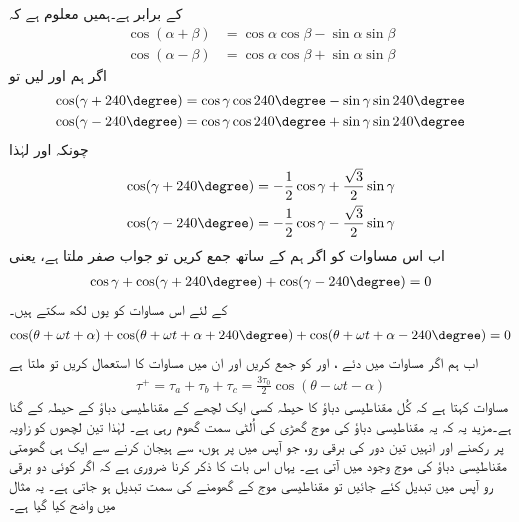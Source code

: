 کے برابر ہے۔ہمیں معلوم ہے کہ 
\begin{align*}
\cos  (\alpha +\beta)&=\cos \alpha \cos \beta-\sin \alpha \sin \beta\\
\cos  (\alpha -\beta)&=\cos \alpha \cos \beta+\sin \alpha \sin \beta
\end{align*}
اگر ہم  اور  لیں تو
\begin{align*}
\cos (\gamma+240\degree)&=\cos \gamma \cos 240\degree-\sin \gamma \sin 240\degree\\
\cos (\gamma-240\degree)&=\cos \gamma \cos 240\degree+\sin \gamma \sin 240\degree
\end{align*}
چونکہ  اور  لہٰذا
\begin{align*}
\cos (\gamma+240\degree)&=-\frac{1}{2}\cos \gamma +\frac{\sqrt{3}}{2}\sin \gamma\\
\cos (\gamma-240\degree)&=-\frac{1}{2}\cos \gamma -\frac{\sqrt{3}}{2}\sin \gamma
\end{align*}
اب اس مساوات کو اگر ہم   کے ساتھ جمع کریں تو جواب صفر ملتا ہے، یعنی
\begin{align*}
\cos \gamma +\cos (\gamma+240\degree)+\cos (\gamma-240\degree)=0
\end{align*}
 کے لئے اس مساوات کو یوں لکھ سکتے ہیں۔
\begin{align}\label{مساوات_تبادلہ_تین_سمتیات_جمع_صفر}
\cos (\theta +\omega t +\alpha) +\cos (\theta +\omega t +\alpha+240\degree)+\cos (\theta+\omega t +\alpha-240\degree)=0
\end{align}
اب ہم  اگر مساوات   میں دئے   ،  اور   کو جمع کریں اور ان میں مساوات   کا استعمال کریں تو ملتا ہے
\begin{align}\label{مساوات_تبادلہ_گھومتا_موج}
\tau^+=\tau_a+\tau_b+\tau_c=\frac{3 \tau_0}{2} \cos (\theta -\omega t -\alpha)
\end{align}
مساوات  کہتا ہے کہ کُل مقناطیسی دباؤ کا حیطہ کسی ایک لچھے کے مقناطیسی دباؤ کے حیطہ کے  گنا ہے۔مزید یہ کہ یہ مقناطیسی دباؤ کی موج گھڑی کی اُلٹی سمت گھوم رہی ہے۔ لہٰذا تین لچھوں کو   زاویہ پر رکھنے اور انہیں تین دور کی برقی رو، جو آپس میں  پر ہوں،  سے  ہیجان کرنے سے ایک ہی گھومتی مقناطیسی دباؤ کی موج وجود میں آتی ہے۔ یہاں اس بات کا ذکر کرنا ضروری ہے کہ اگر کوئی دو برقی رو آپس میں تبدیل کئے جائیں تو مقناطیسی موج کے گھومنے کی سمت تبدیل ہو جاتی ہے۔  یہ مثال میں واضح کیا گیا ہے۔

